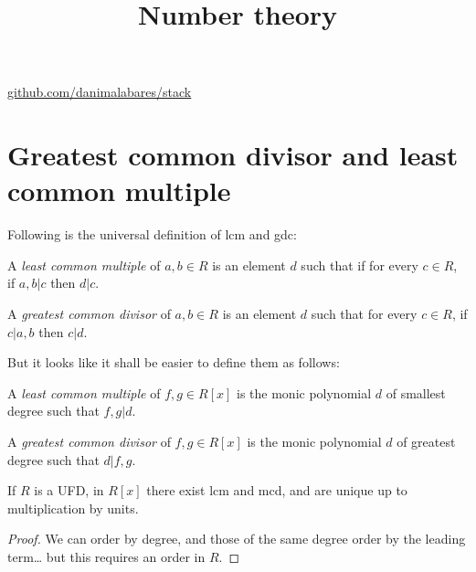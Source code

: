 



\title{Number theory}
\maketitle

\label{section-phantom}
\hfill
\href{http://github.com/danimalabares/stack}{github.com/danimalabares/stack}

\tableofcontents




\section{Greatest common divisor and least common multiple}
\label{section-gcd-and-lcm}

Following is the universal definition of lcm and gdc:

\begin{definition}
\label{definition-lcm-and-gdc-universal}
A {\it least common multiple} of $a,b \in R$ is an element $d$ such that if for
every $c\in R$, if $a,b|c$ then $d|c$.

A {\it greatest common divisor} of $a,b \in R$ is an element $d$ such that
for every  $c \in R$,  if $c|a,b$ then  $c|d$.
\end{definition}

But it looks like it shall be easier to define them
as follows:

\begin{definition}
\label{definition-lcm-and-gdc-polynomial}
A {\it least common multiple} of $f,g \in R[x]$ is the monic polynomial $d$ of
smallest degree such that $f,g|d$.

A {\it greatest common divisor} of $f,g\in R[x]$ is the monic polynomial $d$ of
greatest degree such that $d|f,g$.
\end{definition}

\begin{lemma}
\label{lemma-existence-of-lcm-and-gcd}
If $R$ is a UFD, in $R[x]$ there exist lcm and mcd, and are unique up to 
multiplication by units.
\end{lemma}

\begin{proof}
We can order by degree, and those of the same degree order by the leading
term… but this requires an order in $R$.
\end{proof}

